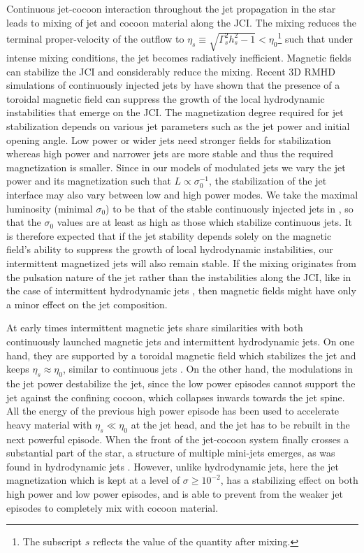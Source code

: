 \documentclass[fleqn,usenatbib]{mnras}
\begin{document}
	Continuous jet-cocoon interaction throughout the jet propagation in the star leads to mixing of jet and cocoon {material} along the JCI. The mixing reduces the terminal proper-velocity of the outflow to $ \eta_s \equiv \sqrt{\Gamma_s^2h_s^2-1} < \eta_0 $\footnote{The subscript $ s $ reflects the value of the quantity after mixing.} such that under intense mixing conditions, the jet becomes radiatively inefficient.
	Magnetic fields can stabilize the JCI and considerably reduce the mixing.
	Recent 3D RMHD simulations of continuously injected jets by \citet{Gottlieb2020b} have shown that the presence of a toroidal magnetic field can suppress the growth of the local hydrodynamic instabilities that emerge on the JCI. The magnetization degree required for jet stabilization depends on various jet parameters such as the jet power and initial opening angle. Low power or wider jets need stronger fields for stabilization whereas high power and narrower jets are more stable and thus the required magnetization is smaller. 
	Since in our models of modulated jets we vary the jet power and its magnetization such that $ L \propto \sigma_0^{-1} $, the stabilization of the jet interface may also vary between low and high power modes. We take the maximal luminosity (minimal $\sigma_0 $) to be that of the stable continuously injected jets in \citet{Gottlieb2020b}, so that the $ \sigma_0 $ values are at least as high as those which stabilize continuous jets. It is therefore expected that if the jet stability depends solely on the magnetic field's ability to suppress the growth of local hydrodynamic instabilities, our intermittent magnetized jets will also remain stable.
	If the mixing originates from the pulsation nature of the jet rather than the instabilities along the JCI, like in the case of intermittent hydrodynamic jets \citep{Gottlieb2020a}, then magnetic fields might have only a minor effect on the jet composition.

	At early times intermittent magnetic jets share similarities with both continuously launched magnetic jets and intermittent hydrodynamic jets.
	On one hand, they are supported by a toroidal magnetic field which stabilizes the jet and keeps $ \eta_s \approx \eta_0 $, similar to continuous jets \citep{Gottlieb2020b}.
	On the other hand, the modulations in the jet power destabilize the jet, since the low power episodes cannot support the jet against the confining cocoon, which collapses inwards towards the jet spine. All the energy of the previous high power episode has been used to accelerate heavy material with $ \eta_s \ll \eta_0 $ at the jet head, and the jet has to be rebuilt in the next powerful episode. When the front of the jet-cocoon system finally crosses a substantial part of the star, a structure of multiple mini-jets emerges, as was found in hydrodynamic jets \citep{Gottlieb2020a}.
    However, unlike hydrodynamic jets, here the jet magnetization which is kept at a level of $ \sigma \geq 10^{-2}$, has a stabilizing effect on both high power and low power episodes, and is able to prevent from the weaker jet episodes to completely mix with cocoon material.
	
\end{document}
